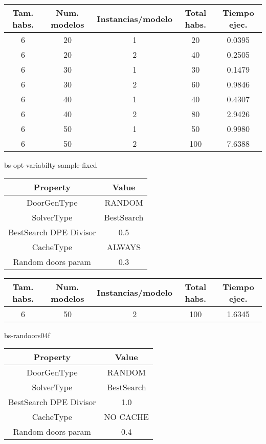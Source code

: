 \begin{center}
	\begin{tabular}{ | c | c | c | c | c | }
\hline
Tam. habs. & Num. modelos & Instancias/modelo & Total habs. & Tiempo ejec. \\ \hline 
6 & 20 & 1 & 20 & 0.0395 \\ 
6 & 20 & 2 & 40 & 0.2505 \\ 
6 & 30 & 1 & 30 & 0.1479 \\ 
6 & 30 & 2 & 60 & 0.9846 \\ 
6 & 40 & 1 & 40 & 0.4307 \\ 
6 & 40 & 2 & 80 & 2.9426 \\ 
6 & 50 & 1 & 50 & 0.9980 \\ 
6 & 50 & 2 & 100 & 7.6388 \\ 
\hline
	\end{tabular}
\end{center}

bs-opt-variabilty-sample-fixed
\begin{center}
	\begin{tabular}{ | c | c | }
\hline
 		Property & Value \\ \hline
DoorGenType & RANDOM \\ 
SolverType & BestSearch \\ 
BestSearch DPE Divisor & 0.5 \\ 
CacheType & ALWAYS \\ 
Random doors param & 0.3 \\ 
\hline
	\end{tabular}
\end{center}

\begin{center}
	\begin{tabular}{ | c | c | c | c | c | }
\hline
Tam. habs. & Num. modelos & Instancias/modelo & Total habs. & Tiempo ejec. \\ \hline 
6 & 50 & 2 & 100 & 1.6345 \\ 
\hline
	\end{tabular}
\end{center}

bs-randoors04f
\begin{center}
	\begin{tabular}{ | c | c | }
\hline
 		Property & Value \\ \hline
DoorGenType & RANDOM \\ 
SolverType & BestSearch \\ 
BestSearch DPE Divisor & 1.0 \\ 
CacheType & NO CACHE \\ 
Random doors param & 0.4 \\ 
\hline
	\end{tabular}
\end{center}

